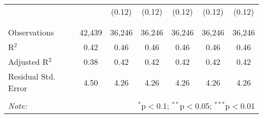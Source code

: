 \begin{table}[!htbp]
\begin{tabular}{@{\extracolsep{5pt}}lcccccc}
  &  & (0.12) & (0.12) & (0.12) & (0.12) & (0.12) \\ 
  & & & & & & \\ 
\hline \\[-1.8ex] 
Observations & 42,439 & 36,246 & 36,246 & 36,246 & 36,246 & 36,246 \\ 
R$^{2}$ & 0.42 & 0.46 & 0.46 & 0.46 & 0.46 & 0.46 \\ 
Adjusted R$^{2}$ & 0.38 & 0.42 & 0.42 & 0.42 & 0.42 & 0.42 \\ 
Residual Std. Error & 4.50 & 4.26 & 4.26 & 4.26 & 4.26 & 4.26 \\ 
\hline 
\hline \\[-1.8ex] 
\textit{Note:}  & \multicolumn{6}{r}{$^{*}$p$<$0.1; $^{**}$p$<$0.05; $^{***}$p$<$0.01} \\ 
\end{tabular} 
\end{table} 
